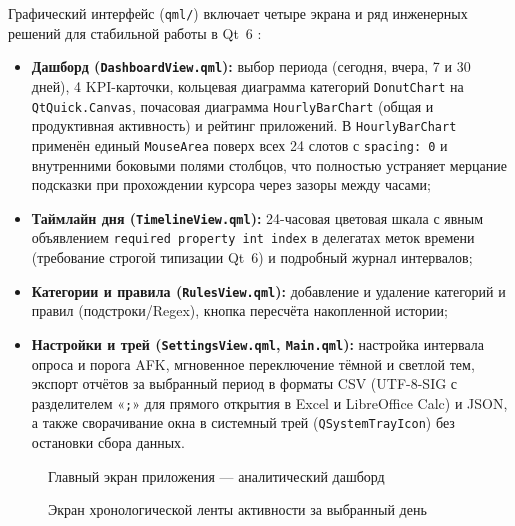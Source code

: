 \documentclass{timcw}
\begin{document}
Графический интерфейс (\texttt{qml/}) включает четыре экрана и ряд инженерных решений для стабильной работы в Qt~6 \cite{qt_quick}:
\begin{itemize}
  \item \textbf{Дашборд (\texttt{DashboardView.qml}):} выбор периода (сегодня, вчера, 7 и 30 дней), 4 KPI-карточки, кольцевая диаграмма категорий \texttt{DonutChart} на \texttt{QtQuick.Canvas}, почасовая диаграмма \texttt{HourlyBarChart} (общая и продуктивная активность) и рейтинг приложений. В \texttt{HourlyBarChart} применён единый \texttt{MouseArea} поверх всех 24 слотов с \texttt{spacing: 0} и внутренними боковыми полями столбцов, что полностью устраняет мерцание подсказки при прохождении курсора через зазоры между часами;
  \item \textbf{Таймлайн дня (\texttt{TimelineView.qml}):} 24-часовая цветовая шкала с явным объявлением \texttt{required property int index} в делегатах меток времени (требование строгой типизации Qt~6) и подробный журнал интервалов;
  \item \textbf{Категории и правила (\texttt{RulesView.qml}):} добавление и удаление категорий и правил (подстроки/Regex), кнопка пересчёта накопленной истории;
  \item \textbf{Настройки и трей (\texttt{SettingsView.qml}, \texttt{Main.qml}):} настройка интервала опроса и порога AFK, мгновенное переключение тёмной и светлой тем, экспорт отчётов за выбранный период в форматы CSV (UTF-8-SIG с разделителем «\texttt{;}» для прямого открытия в Excel и LibreOffice Calc) и JSON, а также сворачивание окна в системный трей (\texttt{QSystemTrayIcon}) без остановки сбора данных.
\end{itemize}

\begin{figure}[H]
\centering
\caption{Главный экран приложения --- аналитический дашборд}
\label{fig:ui_dashboard}
\end{figure}

\begin{figure}[H]
\centering
\caption{Экран хронологической ленты активности за выбранный день}
\label{fig:ui_timeline}
\end{figure}
\end{document}
